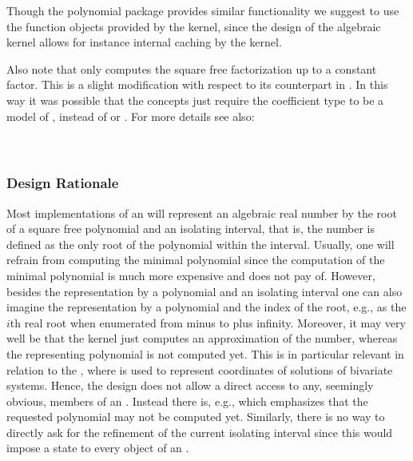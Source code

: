 Though the polynomial package provides similar functionality we suggest to use 
the function objects provided by the kernel, since the design of the algebraic kernel 
allows for instance internal caching by the kernel. 


Also note that   only computes the square free 
factorization up to a constant factor. This is a slight modification with respect to its 
counterpart in . In this way it was possible that the concepts just require 
the coefficient type to be a model of , instead of  or . 
For more details see also:\\
 \\
\\

\subsubsection{Design Rationale}

Most implementations of an  will represent
an algebraic real number by the root of a square free polynomial and
an isolating interval, that is, the number is defined as the only
root of the polynomial within the interval. Usually, one will refrain
from computing the minimal polynomial since the computation of the
minimal polynomial is much more expensive and does not pay of. However,
besides the representation by a polynomial and an isolating interval
one can also imagine the representation by a polynomial and the index
of the root, e.g., as the $i$th real root when enumerated from minus
to plus infinity. Moreover, it may very well be that the kernel just
computes an approximation of the number, whereas the representing
polynomial is not computed yet. 
This is in particular relevant in relation to the ,
where  is used to represent coordinates of solutions of bivariate systems.
Hence, the design does
not allow a direct access to any, seemingly obvious, members of an
. Instead there is, e.g.,
 which emphasizes
that the requested polynomial may not be computed yet. Similarly,
there is no way to directly ask for the refinement of the current
isolating interval since this would impose a state to every object of
an .


